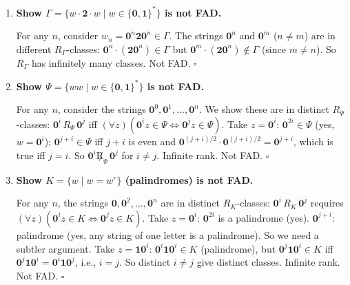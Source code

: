 \begin{enumerate}[{2.}1.]
Suppose $P$ is FAD with $n$ states. Take a prime $p>n$ and $w=\mathbf{d}^p\in P$. By pumping: $w=uvw'$ with $|uv|\leq n$, $|v|=k\geq 1$, so $v=\mathbf{d}^k$ and $u=\mathbf{d}^j$, $w'=\mathbf{d}^{p-j-k}$. Then $uv^iw'=\mathbf{d}^{j+ik+(p-j-k)}=\mathbf{d}^{p+(i-1)k}$ must be in $P$ for all $i\geq 0$. So $p+(i-1)k$ must be prime for all $i\geq 0$. Take $i=p+1$: $p+pk=p(1+k)$, which is composite (both factors $>1$ since $p\geq 2$ and $k\geq 1$). Contradiction. $\square$

\item \textbf{Show $\Gamma=\{w\cdot\mathbf{2}\cdot w\mid w\in\{\mathbf{0},\mathbf{1}\}^*\}$ is not FAD.}

For any $n$, consider $w_n=\mathbf{0}^n\mathbf{2}\mathbf{0}^n\in\Gamma$. The strings $\mathbf{0}^n$ and $\mathbf{0}^m$ ($n\neq m$) are in different $R_\Gamma$-classes: $\mathbf{0}^n\cdot(\mathbf{2}\mathbf{0}^n)\in\Gamma$ but $\mathbf{0}^m\cdot(\mathbf{2}\mathbf{0}^n)\notin\Gamma$ (since $m\neq n$). So $R_\Gamma$ has infinitely many classes. Not FAD. $\square$

\item \textbf{Show $\Psi=\{ww\mid w\in\{\mathbf{0},\mathbf{1}\}^*\}$ is not FAD.}

For any $n$, consider the strings $\mathbf{0}^0,\mathbf{0}^1,\ldots,\mathbf{0}^n$. We show these are in distinct $R_\Psi$-classes: $\mathbf{0}^i\,R_\Psi\,\mathbf{0}^j$ iff $(\forall z)(\mathbf{0}^iz\in\Psi\Leftrightarrow\mathbf{0}^jz\in\Psi)$. Take $z=\mathbf{0}^i$: $\mathbf{0}^{2i}\in\Psi$ (yes, $w=\mathbf{0}^i$); $\mathbf{0}^{j+i}\in\Psi$ iff $j+i$ is even and $\mathbf{0}^{(j+i)/2}\cdot\mathbf{0}^{(j+i)/2}=\mathbf{0}^{j+i}$, which is true iff $j=i$. So $\mathbf{0}^i\not R_\Psi\,\mathbf{0}^j$ for $i\neq j$. Infinite rank. Not FAD. $\square$

\item \textbf{Show $K=\{w\mid w=w^r\}$ (palindromes) is not FAD.}

For any $n$, the strings $\mathbf{0},\mathbf{0}^2,\ldots,\mathbf{0}^n$ are in distinct $R_K$-classes: $\mathbf{0}^i\,R_K\,\mathbf{0}^j$ requires $(\forall z)(\mathbf{0}^iz\in K\Leftrightarrow\mathbf{0}^jz\in K)$. Take $z=\mathbf{0}^i$: $\mathbf{0}^{2i}$ is a palindrome (yes). $\mathbf{0}^{j+i}$: palindrome (yes, any string of one letter is a palindrome). So we need a subtler argument. Take $z=\mathbf{1}\mathbf{0}^i$: $\mathbf{0}^i\mathbf{1}\mathbf{0}^i\in K$ (palindrome), but $\mathbf{0}^j\mathbf{1}\mathbf{0}^i\in K$ iff $\mathbf{0}^j\mathbf{1}\mathbf{0}^i=\mathbf{0}^i\mathbf{1}\mathbf{0}^j$, i.e., $i=j$. So distinct $i\neq j$ give distinct classes. Infinite rank. Not FAD. $\square$


\end{enumerate}
